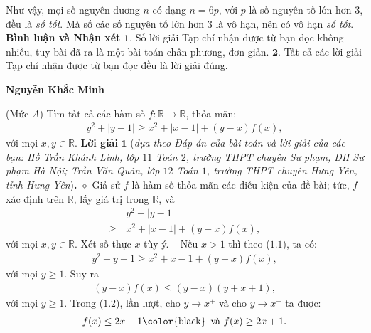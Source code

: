 \begin{multicols}{2}
	\vskip 0.05cm
	Như vậy, mọi số nguyên dương $n$ có dạng $n = 6p$, với $p$ là số nguyên tố lớn hơn $3$, đều là \textit{số tốt}. Mà số các số nguyên tố lớn hơn $3$ là vô hạn, nên có vô hạn \textit{số tốt}.
	\vskip 0.05cm
	\textbf{\color{thachthuctoanhoc}Bình luận và Nhận xét}
	\vskip 0.05cm
	$\pmb{1.}$ Số lời giải Tạp chí nhận được từ bạn đọc không nhiều, tuy bài đã ra là một bài toán chân phương, đơn giản.
	\vskip 0.05cm
	$\pmb{2.}$ Tất cả các lời giải Tạp chí nhận được từ bạn đọc đều là lời giải đúng.
	\begin{flushright}
		\textbf{\color{thachthuctoanhoc}Nguyễn Khắc Minh}
	\end{flushright}
	{}
	(Mức $A$) Tìm tất cả các hàm số  \linebreak$f: \mathbb{R} \to \mathbb{R}$, thỏa mãn:
	\begin{align*}
		{y^2} + |y - 1| \ge {x^2} + |x - 1| + \left( {y - x} \right)f(x),
	\end{align*}
	với mọi $x, y \in \mathbb{R}$.
	\vskip 0.05cm 
	\textbf{\color{thachthuctoanhoc}Lời giải} $\pmb{1}$ (\textit{dựa theo Đáp án của bài toán và lời giải của các bạn: Hồ Trần Khánh Linh, lớp $11$ Toán $2$, trường THPT chuyên Sư phạm, ĐH Sư phạm Hà Nội; Trần Văn Quân, lớp $12$ Toán $1$, trường THPT chuyên Hưng Yên, tỉnh Hưng Yên})\textbf{\color{thachthuctoanhoc}.}
	\vskip 0.05cm
	$\diamond$ Giả sử $f$  là hàm số thỏa mãn các điều kiện của đề bài; tức, $f$   xác định trên  $\mathbb{R}$, lấy giá trị trong  $\mathbb{R}$, và
	\begin{align*}
		&{y^2} + |y - 1| \\
		\ge \,&{x^2} + |x - 1| + \left( {y - x} \right)f(x), \tag{$1.1$}
	\end{align*}
	với mọi $x,y \in \mathbb{R}$.
	\vskip 0.05cm  
	Xét số thực $x$ tùy ý.
	\vskip 0.05cm
	-- Nếu $x > 1$ thì theo ($1.1$), ta có:
	\begin{align*}
		{y^2} + y - 1 \ge {x^2} + x - 1 + \left( {y - x} \right)f(x),
	\end{align*}
	với mọi $y \ge 1$.
	\vskip 0.05cm
	Suy ra
	\begin{align*}
		\left( {y - x} \right)f(x) \le \left( {y - x} \right)\left( {y + x + 1} \right), \tag{$1.2$}
	\end{align*}
	với mọi $y \ge 1$.
	\vskip 0.05cm
	Trong ($1.2$), lần lượt, cho $y \to x^+$  và cho  $y \to x^-$ ta được:
	\begin{align*}
		f(x) \le 2x + 1 \text{\color{black}\, và } f(x) \ge 2x + 1.
	\end{align*}

\end{multicols}
